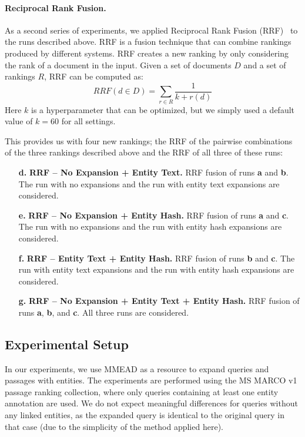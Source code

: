 \paragraph{Reciprocal Rank Fusion.} As a second series of experiments, we applied Reciprocal Rank Fusion (RRF)~\citep{10.1145/1571941.1572114} to the runs described above. RRF is a fusion technique that can combine rankings produced by different systems. RRF creates a new ranking by only considering the rank of a document in the input. Given a set of documents $D$ and a set of rankings $R$, RRF can be computed as: 
\begin{equation}
	\mathit{RRF}(d \in D) = \sum_{r\in R}\frac{1}{k + r(d)}
\end{equation}
Here $k$ is a hyperparameter that can be optimized, but we simply used a default value of $k=60$ for all settings.

This provides us with four new rankings; the RRF of the pairwise combinations of the three rankings described above and the RRF of all three of these runs:
\begin{itemize}
	\item[\textbf{d.}] \textbf{RRF -- No Expansion + Entity Text.} RRF fusion of runs \textbf{a} and \textbf{b}. The run with no expansions and the run with entity text expansions are considered.
	\item[\textbf{e.}] \textbf{RRF -- No Expansion + Entity Hash.} RRF fusion of runs \textbf{a} and \textbf{c}. The run with no expansions and the run with entity hash expansions are considered.
	\item[\textbf{f.}] \textbf{RRF -- Entity Text + Entity Hash.}  RRF fusion of runs \textbf{b} and \textbf{c}. The run with entity text expansions and the run with entity hash expansions are considered.
	\item[\textbf{g.}] \textbf{RRF -- No Expansion + Entity Text + Entity Hash.} RRF fusion of runs \textbf{a}, \textbf{b}, and \textbf{c}. All three runs are considered. 
\end{itemize}

\subsection{Experimental Setup}
In our experiments, we use MMEAD as a resource to expand queries and passages with entities. The experiments are performed using the MS MARCO v1 passage ranking collection, where only queries containing at least one entity annotation are used. We do not expect meaningful differences for queries without any linked entities, as the expanded query is identical to the original query in that case (due to the simplicity of the method applied here). 

